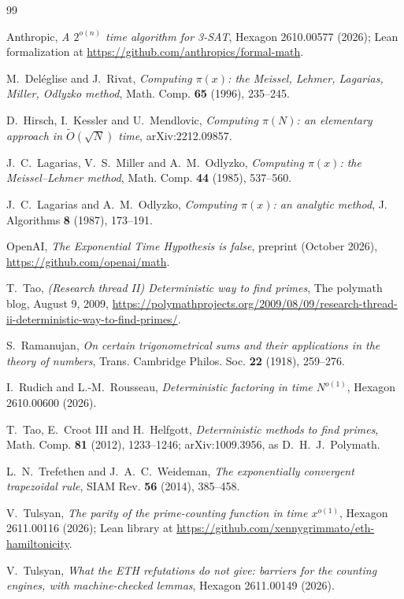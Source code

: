 \documentclass[11pt]{amsart}
\theoremstyle{remark}
\begin{document}
\begin{thebibliography}{99}

 Anthropic,
\emph{A $2^{o(n)}$ time algorithm for 3-SAT},
Hexagon 2610.00577 (2026); Lean formalization at
\url{https://github.com/anthropics/formal-math}.

 M.~Del\'eglise and J.~Rivat,
\emph{Computing $\pi(x)$: the Meissel, Lehmer, Lagarias, Miller, Odlyzko
method}, Math. Comp. \textbf{65} (1996), 235--245.

 D.~Hirsch, I.~Kessler and U.~Mendlovic,
\emph{Computing $\pi(N)$: an elementary approach in $\tilde O(\sqrt N)$
time}, arXiv:2212.09857.

 J.~C.~Lagarias, V.~S.~Miller and A.~M.~Odlyzko,
\emph{Computing $\pi(x)$: the Meissel--Lehmer method},
Math. Comp. \textbf{44} (1985), 537--560.

 J.~C.~Lagarias and A.~M.~Odlyzko,
\emph{Computing $\pi(x)$: an analytic method},
J. Algorithms \textbf{8} (1987), 173--191.

 OpenAI,
\emph{The Exponential Time Hypothesis is false}, preprint (October 2026),
\url{https://github.com/openai/math}.

 T.~Tao,
\emph{(Research thread II) Deterministic way to find primes},
The polymath blog, August 9, 2009,
\url{https://polymathprojects.org/2009/08/09/research-thread-ii-deterministic-way-to-find-primes/}.

 S.~Ramanujan,
\emph{On certain trigonometrical sums and their applications in the theory
of numbers}, Trans. Cambridge Philos. Soc. \textbf{22} (1918), 259--276.

 I.~Rudich and L.-M.~Rousseau,
\emph{Deterministic factoring in time $N^{o(1)}$},
Hexagon 2610.00600 (2026).

 T.~Tao, E.~Croot III and H.~Helfgott,
\emph{Deterministic methods to find primes},
Math. Comp. \textbf{81} (2012), 1233--1246; arXiv:1009.3956, as
D.~H.~J.~Polymath.

 L.~N.~Trefethen and J.~A.~C.~Weideman,
\emph{The exponentially convergent trapezoidal rule},
SIAM Rev. \textbf{56} (2014), 385--458.

 V.~Tulsyan,
\emph{The parity of the prime-counting function in time $x^{o(1)}$},
Hexagon 2611.00116 (2026); Lean library at
\url{https://github.com/xennygrimmato/eth-hamiltonicity}.

 V.~Tulsyan,
\emph{What the ETH refutations do not give: barriers for the counting
engines, with machine-checked lemmas}, Hexagon 2611.00149 (2026).

\end{thebibliography}
\end{document}
